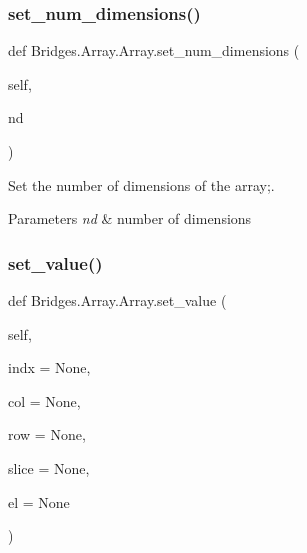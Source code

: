 \mbox{\label{class_bridges_1_1_array_1_1_array_ab85706a4fe954ec7620cd19d076a60d1}} 
\subsubsection{\texorpdfstring{set\+\_\+num\+\_\+dimensions()}{set\_num\_dimensions()}}
{\footnotesize\ttfamily def Bridges.\+Array.\+Array.\+set\+\_\+num\+\_\+dimensions (\begin{DoxyParamCaption}\item[{}]{self,  }\item[{}]{nd }\end{DoxyParamCaption})}



Set the number of dimensions of the array;. 


\begin{DoxyParams}{Parameters}
{\em nd} & number of dimensions \\
\hline
\end{DoxyParams}
\mbox{\label{class_bridges_1_1_array_1_1_array_a900af8a17ee9cac42e2d23b00562a783}} 
\subsubsection{\texorpdfstring{set\+\_\+value()}{set\_value()}}
{\footnotesize\ttfamily def Bridges.\+Array.\+Array.\+set\+\_\+value (\begin{DoxyParamCaption}\item[{}]{self,  }\item[{}]{indx = {\ttfamily None},  }\item[{}]{col = {\ttfamily None},  }\item[{}]{row = {\ttfamily None},  }\item[{}]{slice = {\ttfamily None},  }\item[{}]{el = {\ttfamily None} }\end{DoxyParamCaption})}



